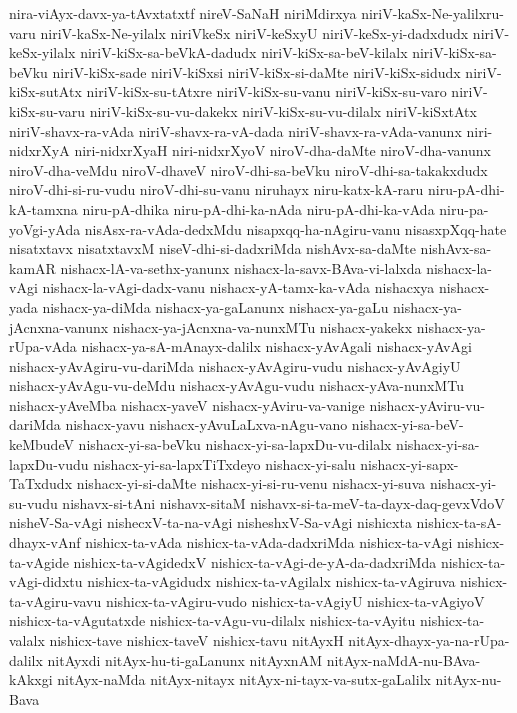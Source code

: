 {nira-viAyx-davx-ya-tAvxtatxtf
nireV-SaNaH
niriMdirxya
niriV-kaSx-Ne-yalilxru-varu
niriV-kaSx-Ne-yilalx
niriVkeSx
niriV-keSxyU
niriV-keSx-yi-dadxdudx
niriV-keSx-yilalx
niriV-kiSx-sa-beVkA-dadudx
niriV-kiSx-sa-beV-kilalx
niriV-kiSx-sa-beVku
niriV-kiSx-sade
niriV-kiSxsi
niriV-kiSx-si-daMte
niriV-kiSx-sidudx
niriV-kiSx-sutAtx
niriV-kiSx-su-tAtxre
niriV-kiSx-su-vanu
niriV-kiSx-su-varo
niriV-kiSx-su-varu
niriV-kiSx-su-vu-dakekx
niriV-kiSx-su-vu-dilalx
niriV-kiSxtAtx
niriV-shavx-ra-vAda
niriV-shavx-ra-vA-dada
niriV-shavx-ra-vAda-vanunx
niri-nidxrXyA
niri-nidxrXyaH
niri-nidxrXyoV
niroV-dha-daMte
niroV-dha-vanunx
niroV-dha-veMdu
niroV-dhaveV
niroV-dhi-sa-beVku
niroV-dhi-sa-takakxdudx
niroV-dhi-si-ru-vudu
niroV-dhi-su-vanu
niruhayx
niru-katx-kA-raru
niru-pA-dhi-kA-tamxna
niru-pA-dhika
niru-pA-dhi-ka-nAda
niru-pA-dhi-ka-vAda
niru-pa-yoVgi-yAda
nisAsx-ra-vAda-dedxMdu
nisapxqq-ha-nAgiru-vanu
nisasxpXqq-hate
nisatxtavx
nisatxtavxM
niseV-dhi-si-dadxriMda
nishAvx-sa-daMte
nishAvx-sa-kamAR
nishacx-lA-va-sethx-yanunx
nishacx-la-savx-BAva-vi-lalxda
nishacx-la-vAgi
nishacx-la-vAgi-dadx-vanu
nishacx-yA-tamx-ka-vAda
nishacxya
nishacx-yada
nishacx-ya-diMda
nishacx-ya-gaLanunx
nishacx-ya-gaLu
nishacx-ya-jAcnxna-vanunx
nishacx-ya-jAcnxna-va-nunxMTu
nishacx-yakekx
nishacx-ya-rUpa-vAda
nishacx-ya-sA-mAnayx-dalilx
nishacx-yAvAgali
nishacx-yAvAgi
nishacx-yAvAgiru-vu-dariMda
nishacx-yAvAgiru-vudu
nishacx-yAvAgiyU
nishacx-yAvAgu-vu-deMdu
nishacx-yAvAgu-vudu
nishacx-yAva-nunxMTu
nishacx-yAveMba
nishacx-yaveV
nishacx-yAviru-va-vanige
nishacx-yAviru-vu-dariMda
nishacx-yavu
nishacx-yAvuLaLxva-nAgu-vano
nishacx-yi-sa-beV-keMbudeV
nishacx-yi-sa-beVku
nishacx-yi-sa-lapxDu-vu-dilalx
nishacx-yi-sa-lapxDu-vudu
nishacx-yi-sa-lapxTiTxdeyo
nishacx-yi-salu
nishacx-yi-sapx-TaTxdudx
nishacx-yi-si-daMte
nishacx-yi-si-ru-venu
nishacx-yi-suva
nishacx-yi-su-vudu
nishavx-si-tAni
nishavx-sitaM
nishavx-si-ta-meV-ta-dayx-daq-gevxVdoV
nisheV-Sa-vAgi
nishecxV-ta-na-vAgi
nisheshxV-Sa-vAgi
nishicxta
nishicx-ta-sA-dhayx-vAnf
nishicx-ta-vAda
nishicx-ta-vAda-dadxriMda
nishicx-ta-vAgi
nishicx-ta-vAgide
nishicx-ta-vAgidedxV
nishicx-ta-vAgi-de-yA-da-dadxriMda
nishicx-ta-vAgi-didxtu
nishicx-ta-vAgidudx
nishicx-ta-vAgilalx
nishicx-ta-vAgiruva
nishicx-ta-vAgiru-vavu
nishicx-ta-vAgiru-vudo
nishicx-ta-vAgiyU
nishicx-ta-vAgiyoV
nishicx-ta-vAgutatxde
nishicx-ta-vAgu-vu-dilalx
nishicx-ta-vAyitu
nishicx-ta-valalx
nishicx-tave
nishicx-taveV
nishicx-tavu
nitAyxH
nitAyx-dhayx-ya-na-rUpa-dalilx
nitAyxdi
nitAyx-hu-ti-gaLanunx
nitAyxnAM
nitAyx-naMdA-nu-BAva-kAkxgi
nitAyx-naMda
nitAyx-nitayx
nitAyx-ni-tayx-va-sutx-gaLalilx
nitAyx-nu-Bava
}
